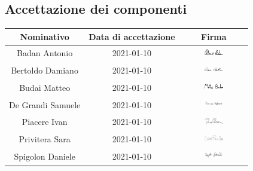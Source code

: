 \subsection{Accettazione dei componenti}
\begin{table}[H]
	\centering
	\renewcommand{\arraystretch}{1.5}
	\begin{tabular}{|c|c|c|}
		\hline
		\rowcolor{lighter-grayer}
		Nominativo & Data di accettazione & Firma \\
		\hline
		Badan Antonio & 2021-01-10 & \includegraphics[width=0.3\textwidth, height=5mm]{res/images/firma1}\\
		\hline
		Bertoldo Damiano & 2021-01-10 & \includegraphics[width=0.3\textwidth, height=5mm]{res/images/firma2} \\
		\hline
		Budai Matteo & 2021-01-10 & \includegraphics[width=0.3\textwidth, height=5mm]{res/images/firma3} \\
		\hline
		De Grandi Samuele & 2021-01-10 & \includegraphics[width=0.3\textwidth, height=5mm]{res/images/firma4} \\
		\hline
		Piacere Ivan & 2021-01-10 & \includegraphics[width=0.3\textwidth, height=5mm]{res/images/firma5}\\
		\hline
		Privitera Sara & 2021-01-10 & \includegraphics[width=0.3\textwidth, height=5mm]{res/images/firma6}\\
		\hline
		Spigolon Daniele & 2021-01-10 & \includegraphics[width=0.3\textwidth, height=5mm]{res/images/firma7}\\
		\hline
	\end{tabular}
\end{table}

